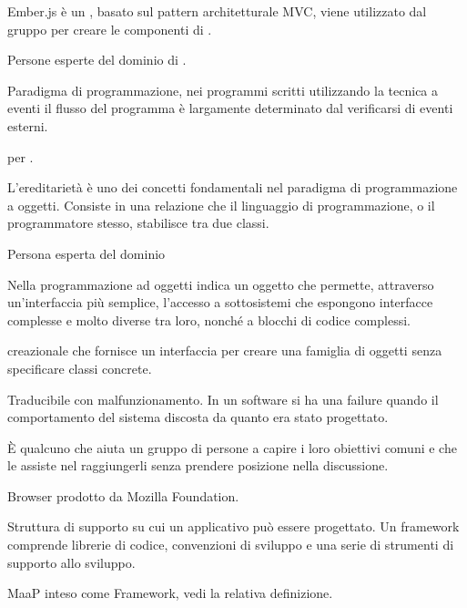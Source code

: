 
Ember.js è un   , basato sul pattern architetturale MVC, viene utilizzato dal gruppo per creare le componenti  di \ProjectName{}.

Persone esperte del dominio di .

Paradigma di programmazione, nei programmi scritti utilizzando la tecnica a eventi il flusso del programma è largamente determinato dal verificarsi di eventi esterni. 

 per .

L'ereditarietà è uno dei concetti fondamentali nel paradigma di programmazione a oggetti. Consiste in una relazione che il linguaggio di programmazione, o il programmatore stesso, stabilisce tra due classi.

Persona esperta del dominio 


Nella programmazione ad oggetti indica un oggetto che permette, attraverso un'interfaccia più semplice, l'accesso a sottosistemi che espongono interfacce complesse e molto diverse tra loro, nonché a blocchi di codice complessi.

 creazionale che fornisce un interfaccia per creare una famiglia di oggetti senza specificare classi concrete.

Traducibile con malfunzionamento. In un software si ha una failure quando il comportamento del sistema discosta da quanto era stato progettato.

È qualcuno che aiuta un gruppo di persone a capire i loro obiettivi comuni e che le assiste nel raggiungerli senza prendere posizione nella discussione.

Browser  prodotto da Mozilla Foundation.

Struttura di supporto su cui un applicativo può essere progettato.
Un framework comprende librerie di codice, convenzioni di sviluppo e una serie di strumenti di supporto allo sviluppo.

MaaP inteso come Framework, vedi la relativa definizione.

